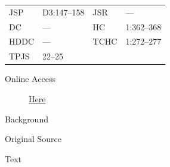 				\begin{tabular}{p{0.5in}p{1in}p{0.5in}p{1in}}
				JSP	 	& D3:147--158		& JSR 		& --- \\
				DC	 	& --- 				& HC 		& 1:362--368 \\
				HDDC 	& ---				& TCHC 		& 1:272--277 \\
				TPJS 	& 22--25			& 	 		&  \\
				\end{tabular}
			
			\begin{description}
				\item[Online Access] \href{https://www.josephsmithpapers.org/paper-summary/letter-to-church-leaders-in-jackson-county-missouri-25-june-1833/1}{Here}
			\end{description}
			
			\begin{description}
				\item[Background]
			\end{description}
			
			
			\begin{description}
				\item[Original Source]
			\end{description}
			
			
			\begin{description}
				\item[Text]
			\end{description}
			
			
